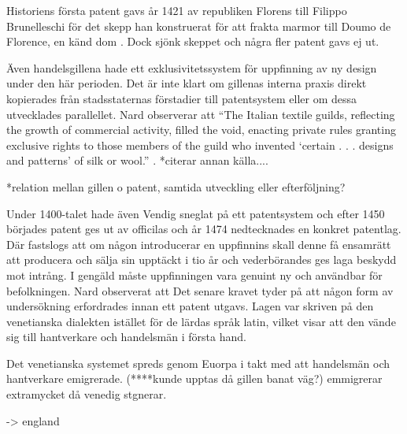 Historiens första patent gavs år 1421 av republiken Florens till Filippo Brunelleschi för det skepp han konstruerat för att frakta marmor till Doumo de Florence, en känd dom \cite{frumkin}. 
Dock sjönk skeppet och några fler patent gavs ej ut. 

Även handelsgillena hade ett exklusivitetssystem för uppfinning av ny design under den här perioden. Det är inte klart om gillenas interna praxis direkt kopierades från stadsstaternas förstadier till patentsystem eller om dessa utvecklades parallellet. Nard observerar att ``The Italian textile guilds, reflecting the growth of commercial activity, filled the void, enacting private rules granting exclusive rights to those members of the guild who invented ‘certain . . . designs and patterns' of silk or wool.'' \cite{nard}. *citerar annan källa....

*relation mellan gillen o patent, samtida utveckling eller efterföljning?

Under 1400-talet hade även Vendig sneglat på ett patentsystem och efter 1450 börjades patent ges ut av officilas och år 1474 nedtecknades en konkret patentlag\cite{frumkin}. 
Där fastslogs att om någon introducerar en uppfinnins skall denne få ensamrätt att producera och sälja sin upptäckt i tio år och vederbörandes ges laga beskydd mot intrång. 
I gengäld måste uppfinningen vara genuint ny och användbar för befolkningen. 
Nard observerat att Det senare kravet tyder på att någon form av undersökning erfordrades innan ett patent utgavs\cite{nard}. 
Lagen var skriven på den venetianska dialekten istället för de lärdas språk latin, vilket visar att den vände sig till hantverkare och handelsmän i första hand.

Det venetianska systemet spreds genom Euorpa i takt med att handelsmän och hantverkare emigrerade. 
(****kunde upptas då gillen banat väg?) emmigrerar extramycket då venedig stgnerar\cite{nard}.

-> england




